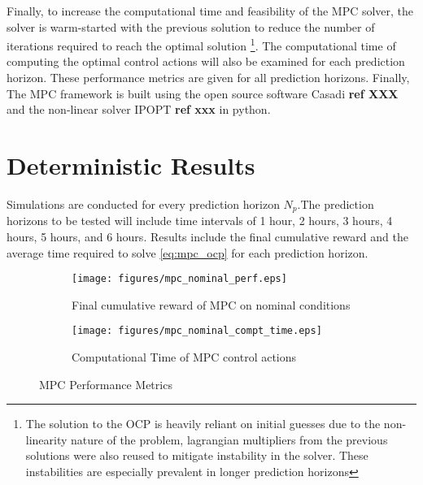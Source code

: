 Finally, to increase the computational time and feasibility of the MPC solver, the solver is warm-started with the previous solution to reduce the number of iterations required to reach the optimal solution  \footnote{The solution to the OCP is heavily reliant on initial guesses due to the non-linearity nature of the problem, lagrangian multipliers from the previous solutions were also reused to mitigate instability in the solver. These instabilities are especially prevalent in longer prediction horizons}. The computational time of computing the optimal control actions will also be examined for each prediction horizon. These performance metrics are given for all prediction horizons. Finally, The MPC framework is built using the open source software Casadi \textbf{ref XXX} and the non-linear solver IPOPT \textbf{ref xxx} in python. 

\section{Deterministic Results}
Simulations are conducted for every prediction horizon $N_p$.The prediction horizons to be tested will include time intervals of 1 hour, 2 hours, 3 hours, 4 hours, 5 hours, and 6 hours. Results include the final cumulative reward and the average time required to solve \autoref{eq:mpc_ocp} for each prediction horizon.

\begin{figure}[h]
	\centering
	\begin{subfigure}[b]{0.49\textwidth}
		\centering
		\texttt{[image: figures/mpc\_nominal\_perf.eps]}
		\caption{Final cumulative reward of MPC on nominal conditions}
		\label{fig:mpc_nominal_perf}
	\end{subfigure}
	\hfill
	\begin{subfigure}[b]{0.49\textwidth}
		\centering
		\texttt{[image: figures/mpc\_nominal\_compt\_time.eps]}
		\caption{Computational Time of MPC control actions}
		\label{fig:mpc_nominal_comp_time}
	\end{subfigure}
	\caption{MPC Performance Metrics}
	\label{fig:mpc_metrics_nominal}
\end{figure}

